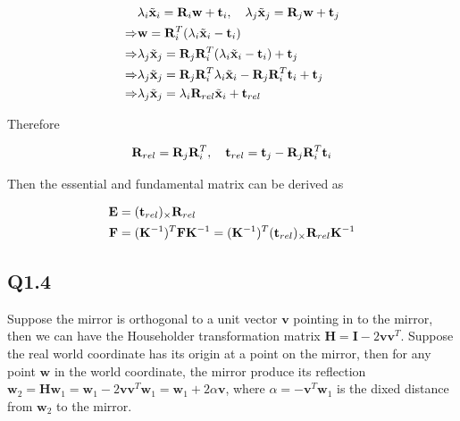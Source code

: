 \documentclass[11pt]{article}
\begin{document}
\begin{align}
    & \lambda_i \tilde{\mathbf{x}}_i = \mathbf{R}_i \mathbf{w} + \mathbf{t}_i, \quad
    \lambda_j \tilde{\mathbf{x}}_j = \mathbf{R}_j \mathbf{w} + \mathbf{t}_j
    \nonumber \\ \Rightarrow &
    \mathbf{w} = \mathbf{R}_i ^T (\lambda_i \tilde{\mathbf{x}}_i - \mathbf{t}_i)
    \nonumber \\ \Rightarrow &
    \lambda_j \tilde{\mathbf{x}}_j = \mathbf{R}_j \mathbf{R}_i ^T (\lambda_i \tilde{\mathbf{x}}_i - \mathbf{t}_i) + \mathbf{t}_j
    \nonumber \\ \Rightarrow &
    \lambda_j \tilde{\mathbf{x}}_j = \mathbf{R}_j \mathbf{R}_i ^T \lambda_i \tilde{\mathbf{x}}_i - \mathbf{R}_j \mathbf{R}_i ^T \mathbf{t}_i + \mathbf{t}_j
    \nonumber \\ \Rightarrow &
    \lambda_j \tilde{\mathbf{x}}_j = \lambda_i \mathbf{R}_{rel} \tilde{\mathbf{x}}_i + \mathbf{t}_{rel}
\end{align}

Therefore

\begin{align}
    \mathbf{R}_{rel} = \mathbf{R}_j \mathbf{R}_i ^T, \quad
    \mathbf{t}_{rel} = \mathbf{t}_j - \mathbf{R}_j \mathbf{R}_i ^T \mathbf{t}_i
\end{align}

Then the essential and fundamental matrix can be derived as

\begin{align}
  \mathbf{E} &= (\mathbf{t}_{rel})_\times \mathbf{R}_{rel} \\
  \mathbf{F} &= (\mathbf{K}^{-1})^T \mathbf{F} \mathbf{K}^{-1} = (\mathbf{K}^{-1})^T (\mathbf{t}_{rel})_\times \mathbf{R}_{rel} \mathbf{K}^{-1}
\end{align}

\newpage

\subsection*{Q1.4}

\newcommand {\bv} {\mathbf{v}}
\newcommand {\bH} {\mathbf{H}}
\newcommand {\bI} {\mathbf{I}}
\newcommand {\bw} {\mathbf{w}}

Suppose the mirror is orthogonal to a unit vector $\bv$ pointing in to the mirror, then we can have the Householder transformation matrix $\bH=\bI - 2\bv\bv^T$. Suppose the real world coordinate has its origin at a point on the mirror, then for any point $\bw$ in the world coordinate, the mirror produce its reflection $\bw_2=\bH\bw_1=\bw_1 - 2\bv\bv^T\bw_1=\bw_1 + 2\alpha\bv$, where $\alpha=-\bv^T\bw_1$ is the dixed distance from $\bw_2$ to the mirror.
\end{document}

